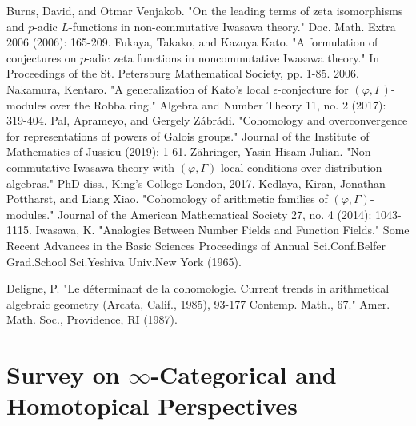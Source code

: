 \documentclass[11pt]{report}
\begin{document}

\begin{thebibliography}{1}
 Burns, David, and Otmar Venjakob. "On the leading terms of zeta isomorphisms and $p$-adic $L$-functions in non-commutative Iwasawa theory." Doc. Math. Extra 2006 (2006): 165-209.	
 Fukaya, Takako, and Kazuya Kato. "A formulation of conjectures on $p$-adic zeta functions in noncommutative Iwasawa theory." In Proceedings of the St. Petersburg Mathematical Society, pp. 1-85. 2006.
 Nakamura, Kentaro. "A generalization of Kato's local $\epsilon$-conjecture for $(\varphi, \Gamma)$-modules over the Robba ring." Algebra and Number Theory 11, no. 2 (2017): 319-404.
 Pal, Aprameyo, and Gergely Z\'abr\'adi. "Cohomology and overconvergence for representations of powers of Galois groups." Journal of the Institute of Mathematics of Jussieu (2019): 1-61.
 Z\"ahringer, Yasin Hisam Julian. "Non-commutative Iwasawa theory with $(\varphi, \Gamma)$-local conditions over distribution algebras." PhD diss., King's College London, 2017.
 Kedlaya, Kiran, Jonathan Pottharst, and Liang Xiao. "Cohomology of arithmetic families of $(\varphi, \Gamma)$-modules." Journal of the American Mathematical Society 27, no. 4 (2014): 1043-1115. 
 Iwasawa, K. "Analogies Between Number Fields and Function Fields." Some Recent Advances in the Basic Sciences Proceedings of Annual Sci.Conf.Belfer Grad.School Sci.Yeshiva Univ.New York (1965).

 Deligne, P. "Le d\'eterminant de la cohomologie. Current trends in arithmetical algebraic geometry (Arcata, Calif., 1985), 93-177 Contemp. Math., 67." Amer. Math. Soc., Providence, RI (1987).
\end{thebibliography}













\chapter{Survey on $\infty$-Categorical and Homotopical Perspectives}

\section{}
\end{document}
